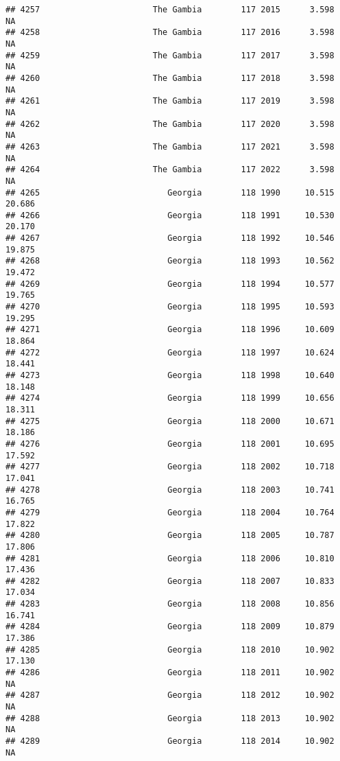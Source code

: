 \documentclass[
]{article}
\begin{document}
\begin{verbatim}
## 4257                       The Gambia        117 2015      3.598         NA
## 4258                       The Gambia        117 2016      3.598         NA
## 4259                       The Gambia        117 2017      3.598         NA
## 4260                       The Gambia        117 2018      3.598         NA
## 4261                       The Gambia        117 2019      3.598         NA
## 4262                       The Gambia        117 2020      3.598         NA
## 4263                       The Gambia        117 2021      3.598         NA
## 4264                       The Gambia        117 2022      3.598         NA
## 4265                          Georgia        118 1990     10.515     20.686
## 4266                          Georgia        118 1991     10.530     20.170
## 4267                          Georgia        118 1992     10.546     19.875
## 4268                          Georgia        118 1993     10.562     19.472
## 4269                          Georgia        118 1994     10.577     19.765
## 4270                          Georgia        118 1995     10.593     19.295
## 4271                          Georgia        118 1996     10.609     18.864
## 4272                          Georgia        118 1997     10.624     18.441
## 4273                          Georgia        118 1998     10.640     18.148
## 4274                          Georgia        118 1999     10.656     18.311
## 4275                          Georgia        118 2000     10.671     18.186
## 4276                          Georgia        118 2001     10.695     17.592
## 4277                          Georgia        118 2002     10.718     17.041
## 4278                          Georgia        118 2003     10.741     16.765
## 4279                          Georgia        118 2004     10.764     17.822
## 4280                          Georgia        118 2005     10.787     17.806
## 4281                          Georgia        118 2006     10.810     17.436
## 4282                          Georgia        118 2007     10.833     17.034
## 4283                          Georgia        118 2008     10.856     16.741
## 4284                          Georgia        118 2009     10.879     17.386
## 4285                          Georgia        118 2010     10.902     17.130
## 4286                          Georgia        118 2011     10.902         NA
## 4287                          Georgia        118 2012     10.902         NA
## 4288                          Georgia        118 2013     10.902         NA
## 4289                          Georgia        118 2014     10.902         NA

\end{verbatim}
\end{document}
